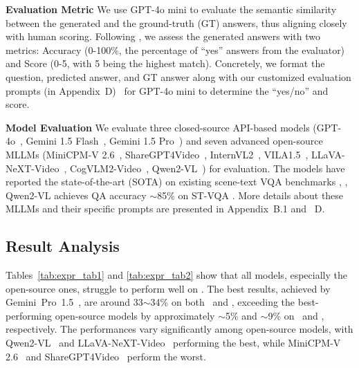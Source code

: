 \noindent\textbf{Evaluation Metric}
We use GPT-4o mini \cite{gpt4omini2024} to evaluate the semantic similarity between the generated and the ground-truth (GT) answers, thus aligning closely with human scoring. Following \cite{maaz2023video}, we assess the generated answers with two metrics: Accuracy (0-100\%, the percentage of ``yes'' answers from the evaluator) and Score (0-5, with 5 being the highest match). Concretely, we format the question, predicted answer, and GT answer along with our customized evaluation prompts (in Appendix~{\color{red}D})~%
for GPT-4o mini to determine the ``yes/no'' and score.




\noindent\textbf{Model Evaluation}
We evaluate three closed-source API-based models (GPT-4o~\cite{achiam2023gpt}, Gemini 1.5 Flash~\cite{reid2024gemini}, Gemini 1.5 Pro~\cite{reid2024gemini}) and seven advanced open-source MLLMs (MiniCPM-V 2.6~\cite{yao2024minicpm}, ShareGPT4Video~\cite{chen2024sharegpt4video}, InternVL2~\cite{chen2024far}, VILA1.5~\cite{lin2024vila}, LLaVA-NeXT-Video~\cite{zhang2024llavanextvideo}, CogVLM2-Video~\cite{hong2024cogvlm2}, Qwen2-VL~\cite{wang2024qwen2}) for evaluation. The models have reported the state-of-the-art (SOTA) on existing scene-text VQA benchmarks \cite{biten2019scene,singh2019towards,gurari2018vizwiz}, \eg, Qwen2-VL achieves QA accuracy $\sim$85\% on ST-VQA \cite{biten2019scene}. More details about these MLLMs and their specific prompts are presented in Appendix~{\color{red}B.1} and ~{\color{red}D}.

\subsection{Result Analysis}
\label{expr:ra}
Tables~\ref{tab:expr_tab1} and \ref{tab:expr_tab2} show that all models, especially the open-source ones, struggle to perform well on \dataset. The best results, achieved by Gemini~Pro~1.5~\cite{reid2024gemini}, are around 33$\sim$34\% on both \datasetout~and \datasetin, exceeding the best-performing open-source models by approximately $\sim$5\% and $\sim$9\% on \datasetout~and \datasetin, respectively. The performances vary significantly among open-source models, with Qwen2-VL~\cite{wang2024qwen2} and LLaVA-NeXT-Video~\cite{zhang2024llavanextvideo} performing the best, while MiniCPM-V 2.6~\cite{yao2024minicpm} and ShareGPT4Video~\cite{chen2024sharegpt4video} perform the worst.



